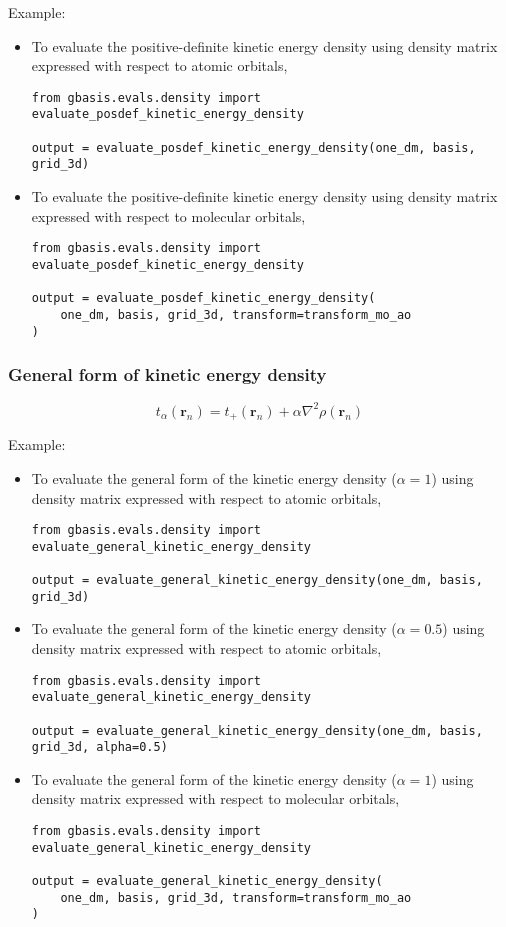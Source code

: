 \documentclass[letterpaper]{article}
\begin{document}
Example:
\begin{itemize}
\item To evaluate the positive-definite kinetic energy density using density
  matrix expressed with respect to atomic orbitals,
  \begin{lstlisting}[xleftmargin=-25pt]
from gbasis.evals.density import evaluate_posdef_kinetic_energy_density

output = evaluate_posdef_kinetic_energy_density(one_dm, basis, grid_3d)
\end{lstlisting}
\item To evaluate the positive-definite kinetic energy density using density
  matrix expressed with respect to molecular orbitals,
  \begin{lstlisting}[xleftmargin=-25pt]
from gbasis.evals.density import evaluate_posdef_kinetic_energy_density

output = evaluate_posdef_kinetic_energy_density(
    one_dm, basis, grid_3d, transform=transform_mo_ao
)
\end{lstlisting}
\end{itemize}
\subsubsection{General form of kinetic energy density}
\begin{equation}
  t_{\alpha} (\mathbf{r}_n) = t_+(\mathbf{r}_n) + \alpha \nabla^2 \rho(\mathbf{r}_n)
\end{equation}

Example:
\begin{itemize}
\item To evaluate the general form of the kinetic energy density ($\alpha=1$)
  using density matrix expressed with respect to atomic orbitals,
  \begin{lstlisting}[xleftmargin=-25pt]
from gbasis.evals.density import evaluate_general_kinetic_energy_density

output = evaluate_general_kinetic_energy_density(one_dm, basis, grid_3d)
\end{lstlisting}
\item To evaluate the general form of the kinetic energy density ($\alpha=0.5$)
  using density matrix expressed with respect to atomic orbitals,
  \begin{lstlisting}[xleftmargin=-25pt]
from gbasis.evals.density import evaluate_general_kinetic_energy_density

output = evaluate_general_kinetic_energy_density(one_dm, basis, grid_3d, alpha=0.5)
\end{lstlisting}
\item To evaluate the general form of the kinetic energy density ($\alpha=1$)
  using density matrix expressed with respect to molecular orbitals,
  \begin{lstlisting}[xleftmargin=-25pt]
from gbasis.evals.density import evaluate_general_kinetic_energy_density

output = evaluate_general_kinetic_energy_density(
    one_dm, basis, grid_3d, transform=transform_mo_ao
)
\end{lstlisting}
\end{itemize}
\end{document}
